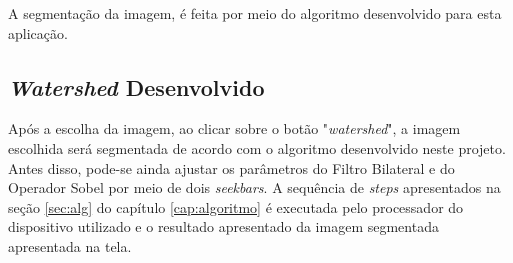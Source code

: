 A segmentação da imagem, é feita por meio do algoritmo desenvolvido para esta aplicação.

\subsection{\textit{Watershed} Desenvolvido}

Após a escolha da imagem, ao clicar sobre o botão "\textit{watershed}", a imagem escolhida será segmentada de acordo com o algoritmo desenvolvido neste projeto. Antes disso, pode-se ainda ajustar os parâmetros do Filtro Bilateral e do Operador Sobel por meio de dois \textit{seekbars}. A sequência de \textit{steps} apresentados na seção \ref{sec:alg} do capítulo \ref{cap:algoritmo} é executada pelo processador do dispositivo utilizado e o resultado apresentado da imagem segmentada apresentada na tela.

